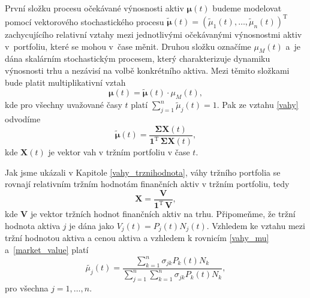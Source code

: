 \documentclass[a4paper,12pt]{report}
\theoremstyle{definition} \newtheorem{definice}[veta]{Definice}
\theoremstyle{remark}
\begin{document}
První složku procesu očekávané výnosnosti aktiv $\boldsymbol{\mu}(t)$ budeme modelovat pomocí vektorového stochastického procesu $\tilde{\boldsymbol{\mu}}(t)=(\tilde{\mu}_1(t),\dots,\tilde{\mu}_n(t))^\mathrm{T}$ zachycujícího relativní vztahy mezi jednotlivými očekávanými výnosnostmi aktiv v~portfoliu, které se mohou v~čase měnit. 
Druhou složku označíme $\mu_M(t)$ a~je dána skalárním stochastickým procesem, který charakterizuje dynamiku výnosnosti trhu a nezávisí na volbě konkrétního aktiva.
Mezi těmito složkami bude platit multiplikativní vztah
\begin{equation} \label{vynos}
\boldsymbol{\mu}(t) =\tilde{\boldsymbol{\mu}}(t)\cdot \mu_M(t),
\end{equation}
kde pro všechny uvažované časy $t$ platí $\sum_{j=1}^n\tilde{\mu}_j(t)=1$.
Pak ze vztahu  \eqref{vahy} odvodíme
\begin{equation} \label{vahy_mu}
\tilde{\boldsymbol{\mu}}(t)=\frac{\boldsymbol{\Sigma}\boldsymbol{X}(t)}{\boldsymbol{1}^\mathrm{T}\,\boldsymbol{\Sigma}\boldsymbol{X}(t)},
\end{equation}
kde $\boldsymbol{X}(t)$ je vektor vah v tržním portfoliu v čase $t$.

Jak jsme ukázali v Kapitole \ref{vahy_trznihodnota}, váhy tržního portfolia se rovnají relativním tržním hodnotám finančních aktiv v tržním portfoliu, tedy
\begin{equation} \label{market_value}
\boldsymbol{X}=\frac{\boldsymbol{V}}{\boldsymbol{1}^\mathrm{T}\,\boldsymbol{V}},
\end{equation}
kde $\boldsymbol{V}$ je vektor tržních hodnot finančních aktiv na trhu.
Připomeňme, že tržní hodnota aktiva $j$ je dána jako $V_j(t)=P_j(t)N_j(t)$.
Vzhledem ke vztahu mezi tržní hodnotou aktiva a cenou aktiva a vzhledem k rovnicím \eqref{vahy_mu} a~\eqref{market_value} %
platí
\begin{equation} \label{vahy_mu_rovnice}
\tilde{{\mu}_j}(t)=\frac{\sum\limits_{k=1}^n\sigma_{jk}P_k(t)N_k}{\sum\limits_{j=1}^n\sum\limits_{k=1}^n\sigma_{jk}P_k(t)N_k},
\end{equation}
pro všechna $j=1, \dots, n$.
\end{document}
